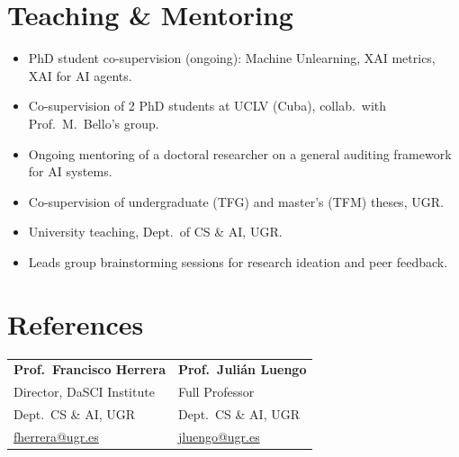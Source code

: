 \documentclass[10pt,a4paper]{article}
\begin{document}
\begin{minipage}[t]{0.64\textwidth}
\vspace{0.3em}

\section*{Teaching \& Mentoring}

\begin{itemize}
  \item PhD student co-supervision (ongoing): Machine Unlearning, XAI metrics, XAI for AI agents.
  \item Co-supervision of 2 PhD students at UCLV (Cuba), collab.~with Prof.~M.~Bello's group.
  \item Ongoing mentoring of a doctoral researcher on a general auditing framework for AI systems.
  \item Co-supervision of undergraduate (TFG) and master's (TFM) theses, UGR.
  \item University teaching, Dept.~of CS \& AI, UGR.
  \item Leads group brainstorming sessions for research ideation and peer feedback.
\end{itemize}

\vspace{0.3em}

\section*{References}

\footnotesize
\begin{tabularx}{\textwidth}{@{}X X@{}}
    \textbf{Prof.~Francisco Herrera} & \textbf{Prof.~Julián Luengo} \\
    Director, DaSCI Institute & Full Professor \\
    Dept.~CS \& AI, UGR & Dept.~CS \& AI, UGR \\
    \href{mailto:fherrera@ugr.es}{fherrera@ugr.es} & \href{mailto:jluengo@ugr.es}{jluengo@ugr.es}
\end{tabularx}
\normalsize

\end{minipage}
\end{document}
